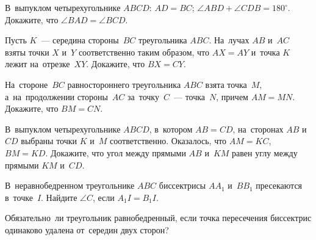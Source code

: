 


\begin{problems}

\item
В~выпуклом четырехугольнике $ABCD$:
$AD = BC$; $\angle ABD + \angle CDB = 180^{\circ}$.
Докажите, что $\angle BAD = \angle BCD$.

\item
Пусть $K$~--- середина стороны~$BC$ треугольника $ABC$.
На~лучах $AB$ и~$AC$ взяты точки $X$ и~$Y$ соответственно таким образом, что
$AX = AY$ и~точка $K$ лежит на~отрезке~$XY$.
Докажите, что $BX = CY$.

\item
На~стороне~$BC$ равностороннего треугольника $ABC$ взята точка~$M$,
а~на~продолжении стороны~$AC$ за~точку~$C$~--- точка~$N$, причем $AM = MN$.
Докажите, что $BM = CN$.

\item
В~выпуклом четырехугольнике $ABCD$, в~котором $AB = CD$, на~сторонах $AB$
и~$CD$ выбраны точки $K$ и~$M$ соответственно.
Оказалось, что $AM = KC$, $BM = KD$.
Докажите, что угол между прямыми $AB$ и~$KM$ равен углу между
прямыми $KM$ и~$CD$.

\item
В~неравнобедренном треугольнике $ABC$ биссектрисы $A A_1$ и~$B B_1$ пресекаются
в~точке~$I$.
Найдите $\angle C$, если $A_1 I = B_1 I$.

\item
Обязательно~ли треугольник равнобедренный, если точка пересечения биссектрис
одинаково удалена от~середин двух сторон?

\end{problems}

